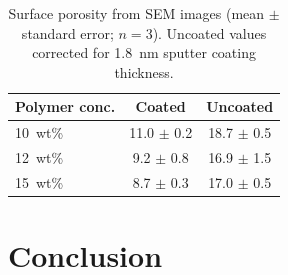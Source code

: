 \documentclass[preprint,12pt,times]{elsarticle}
\begin{document}
\begin{table}[htbp]
\centering
\caption{Surface porosity from SEM images (mean $\pm$ standard error; $n=3$). Uncoated values corrected for 1.8~nm sputter coating thickness.}
\label{tab:surface_porosity}
\begin{tabular}{lcc}
\hline
Polymer conc. & Coated & Uncoated \\
\hline
10~wt\% & 11.0 $\pm$ 0.2 & 18.7 $\pm$ 0.5 \\
12~wt\% &  9.2 $\pm$ 0.8 & 16.9 $\pm$ 1.5 \\
15~wt\% &  8.7 $\pm$ 0.3 & 17.0 $\pm$ 0.5 \\
\hline
\end{tabular}
\end{table}





\FloatBarrier
\section{Conclusion} 
\end{document}
